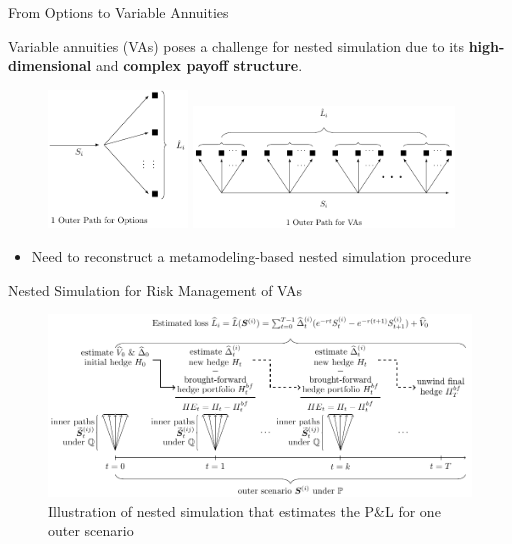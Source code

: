 \documentclass[9pt,handout]{beamer}
\begin{document}
\begin{frame}{From Options to Variable Annuities}

    Variable annuities (VAs) poses a challenge for nested simulation due to its \textbf{high-dimensional} and \textbf{complex payoff structure}.

    \vspace{10pt}

    \begin{figure}[H]
            \includegraphics[width=0.33\textwidth]{./tikz/illustration_spns.pdf}
            \includegraphics[width=0.62\textwidth]{./tikz/illustration_mpns.pdf}
	\end{figure}

    \vspace{10pt}

    \begin{itemize}
        \item Need to reconstruct a metamodeling-based nested simulation procedure
    \end{itemize}

\end{frame}

\begin{frame}{Nested Simulation for Risk Management of VAs}

    \begin{figure}[c]
        \includegraphics[width=\textwidth]{../project2/figures/sns.pdf}
        \caption{Illustration of nested simulation that estimates the P\&L for one outer scenario}
    \end{figure}


\end{frame}
\end{document}
